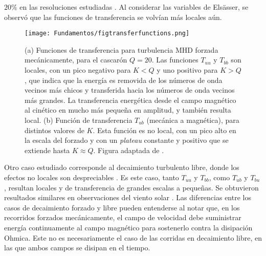 $20\%$ en las resoluciones estudiadas \cite{mininni_large_2006}. Al
considerar las variables de Els\"asser, se observó que las funciones
de transferencia se volvían más locales aún.
\begin{figure}[h!]
  \centering
  \texttt{[image: Fundamentos/figtransferfunctions.png]}
  \caption{(a) Funciones de transferencia para turbulencia MHD forzada
    mecánicamente, para el cascarón $Q = 20$. Las funciones $T_{uu}$ y
    $T_{bb}$ son locales, con un pico negativo para $K<Q$ y uno
    positivo para $K>Q$, que indica que la energía es removida de los
    números de onda vecinos más chicos y transferida hacia los números
    de onda vecinos más grandes. La transferencia energética desde el
    campo magnético al cinético en mucho más pequeña en amplitud, y
    también resulta local. (b) Función de transferencia $T_{ub}$
    (mecánica a magnética), para distintos valores de $K$. Esta
    función es no local, con un pico alto en la escala del forzado y
    con un \emph{plateau} constante y positivo que se extiende hasta
    $K\approx Q$. Figura adaptada de \cite{alexakis_imprint_2005}.}
  \label{fig:transferfunctions}
\end{figure}


Otro caso estudiado corresponde al decaimiento turbulento libre, donde
los efectos no locales son despreciables
\cite{debliquy_energy_2005}. Es este caso, tanto $T_{uu}$ y $T_{bb}$,
como $T_{ub}$ y $T_{bu}$, resultan locales y de transferencia de
grandes escalas a pequeñas. Se obtuvieron resultados similares en
observaciones del viento solar \cite{bruno_solar_2005}. Las
diferencias entre los casos de decaimiento forzado y libre pueden
entenderse al notar que, en los recorridos forzados mecánicamente, el
campo de velocidad debe suministrar energía continuamente al campo
magnético para sostenerlo contra la disipación Ohmica. Este no es
necesariamente el caso de las corridas en decaimiento libre, en las
que ambos campos se disipan en el tiempo.

